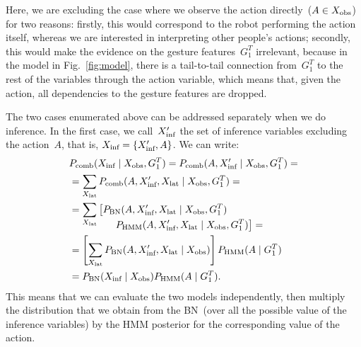 Here, we are excluding the case where we observe the action directly~($A \in X_\text{obs}$) for two reasons: firstly, this would correspond to the robot performing the action itself, whereas we are interested in interpreting other people's actions;
secondly, this would make the evidence on the gesture features~$G_1^T$ irrelevant, because in the model in Fig.~\ref{fig:model}, there is a tail-to-tail connection from~$G_1^T$ to the rest of the variables through the action variable, which means that, given the action, all dependencies to the gesture features are dropped.

The two cases enumerated above can be addressed separately when we do inference.
In the first case, we call~$X_\text{inf}^\prime$ the set of inference variables excluding the action~$A$, that is, $X_\text{inf} = \{X_\text{inf}^\prime, A\}$.
We can write:
\begin{align} \label{eq:fusion_excluding_action}
  & \pcomb(\xinf \given  \xobs, G_1^T) = \pcomb(A, \xinf^\prime \given  \xobs, G_1^T)= \nonumber \\
  &= \sum_{\xlat} \pcomb(A, \xinf^\prime, \xlat \given \xobs, G_1^T)= \nonumber\\
  &= \sum_{\xlat} \left[\pbn(A, \xinf^\prime, \xlat \given \xobs, G_1^T)\right. \nonumber \\[-4mm]
    & \mspace{80mu} \left.\phmm(A, \xinf^\prime, \xlat \given \xobs, G_1^T)\right]= \nonumber \\
  &= \left[\sum_{\xlat} \pbn(A, \xinf^\prime, \xlat \given \xobs)\right] \phmm(A \given G_1^T) \nonumber \\
  &= \pbn(\xinf \given \xobs) \phmm(A \given G_1^T).
\end{align}
This means that we can evaluate the two models independently, then multiply the distribution that we obtain from the \ac{BN}~(over all the possible value of the inference variables) by the \ac{HMM} posterior for the corresponding value of the action.

